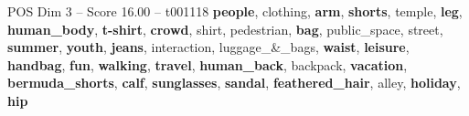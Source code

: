\begin{textsample}{POS Dim 3 – Score 16.00 – t001118}  \label{ex:f3_pos_023}
\textbf{people}, clothing, \textbf{arm}, \textbf{shorts}, temple, \textbf{leg}, \textbf{human\_body}, \textbf{t-shirt}, \textbf{crowd}, shirt, pedestrian, \textbf{bag}, public\_space, street, \textbf{summer}, \textbf{youth}, \textbf{jeans}, interaction, luggage\_\&\_bags, \textbf{waist}, \textbf{leisure}, \textbf{handbag}, \textbf{fun}, \textbf{walking}, \textbf{travel}, \textbf{human\_back}, backpack, \textbf{vacation}, \textbf{bermuda\_shorts}, \textbf{calf}, \textbf{sunglasses}, \textbf{sandal}, \textbf{feathered\_hair}, alley, \textbf{holiday}, \textbf{hip}

\end{textsample}
